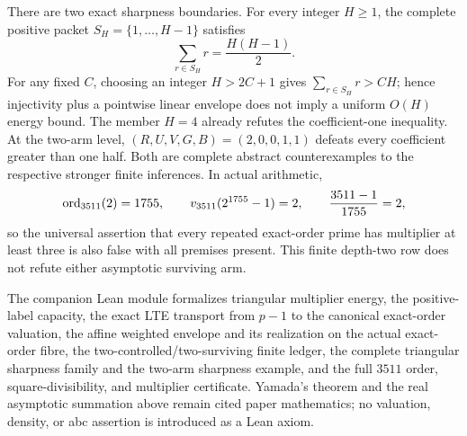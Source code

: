 There are two exact sharpness boundaries.  For every integer $H\ge1$, the
complete positive packet $S_H=\{1,\ldots,H-1\}$ satisfies
\[
 \sum_{r\in S_H}r=\frac{H(H-1)}2.
\]
For any fixed $C$, choosing an integer $H>2C+1$ gives
$\sum_{r\in S_H}r>CH$; hence injectivity plus a pointwise linear envelope
does not imply a uniform $O(H)$ energy bound.  The member $H=4$ already
refutes the coefficient-one inequality.  At the two-arm level,
$(R,U,V,G,B)=(2,0,0,1,1)$ defeats every coefficient greater than one half.
Both are complete abstract counterexamples to the respective stronger
finite inferences.  In actual arithmetic,
\[
 \operatorname{ord}_{3511}(2)=1755,\qquad
 v_{3511}(2^{1755}-1)=2,\qquad
 \frac{3511-1}{1755}=2,
\]
so the universal assertion that every repeated exact-order prime has
multiplier at least three is also false with all premises present.  This
finite depth-two row does not refute either asymptotic surviving arm.

The companion Lean module formalizes triangular multiplier energy, the
positive-label capacity, the exact LTE transport from $p-1$ to the canonical
exact-order valuation, the affine weighted envelope and its realization on
the actual exact-order fibre, the two-controlled/two-surviving finite ledger,
the complete triangular sharpness family and the two-arm sharpness example,
and the full $3511$ order,
square-divisibility, and multiplier certificate.  Yamada's theorem and the
real asymptotic summation above remain cited paper mathematics; no valuation,
density, or abc assertion is introduced as a Lean axiom.
